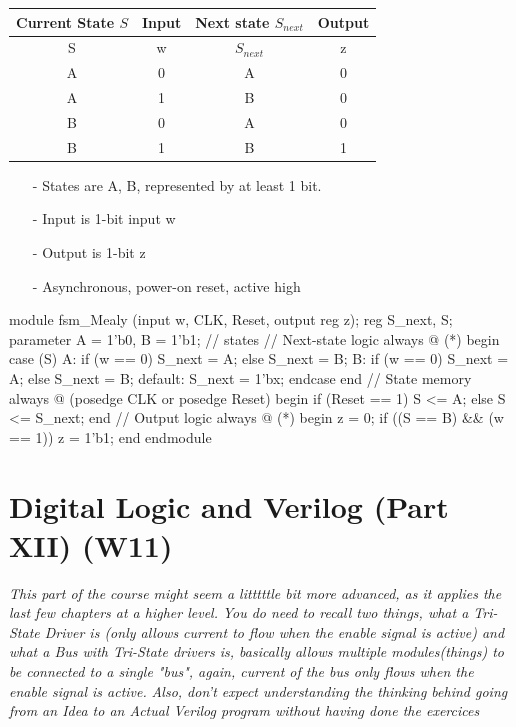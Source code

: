 \documentclass[12pt,openany]{book}
\begin{document}
\begin{minipage}[htp]{0.6\textwidth}
	\footnotesize
		\begin{center}
			\begin{tabular}[w]{|cc|c|c|}
				\hline
				Current State $S$ & Input & Next state $S_{next}$ & Output \\
				\hline
				S & w & $S_{next}$ & z \\
				\hline
				
				A & 0 & A & 0 \\
				A & 1 & B & 0 \\
				B & 0 & A & 0 \\
				B & 1 & B & 1 \\
				\hline
				\end{tabular}
		\end{center}

\end{minipage}
\hfill
\vline
\hfill
\begin{minipage}[htp]{0.35\textwidth}

\begin{center}
	\begin{justify}
			\begin{itemize}
				\item[-] States are A, B, represented by at least 1 bit.
				\item[-] Input is 1-bit input w
				\item[-] Output is 1-bit z
				\item[-] Asynchronous, power-on reset, active high 
			\end{itemize}
	\end{justify}
\end{center}
\end{minipage}
\vfill
\begin{vhdl}
module fsm_Mealy (input w, CLK, Reset, output reg z);
	reg S_next, S;
	parameter A = 1'b0, B = 1'b1; // states
	// Next-state logic
	always @ (*) begin
		case (S)
		A: if (w == 0) S_next = A;
			else S_next = B;
		B: if (w == 0) S_next = A;
			else S_next = B;
		default: S_next = 1'bx;
		endcase
	end
	// State memory
	always @ (posedge CLK or posedge Reset) begin
		if (Reset == 1) S <= A;
		else S <= S_next;
	end
	// Output logic
	always @ (*) begin
		z = 0;
		if ((S == B) && (w == 1)) z = 1'b1;
	end
endmodule
\end{vhdl}


\chapter{Digital Logic and Verilog (Part XII) (W11)}
\textit{This part of the course might seem a litttttle bit more advanced, as it applies the last few chapters at a higher level.} \newline 
\textit{You do need to recall two things, what a Tri-State Driver is (only allows current to flow when the enable signal is active) and what a Bus with Tri-State drivers is, basically allows multiple modules(things) to be connected to a single "bus", again, current of the bus only flows when the enable signal is active.}
\newline
\textit{Also, don't expect understanding the thinking behind going from an Idea to an Actual Verilog program without having done the exercices}
\end{document}
